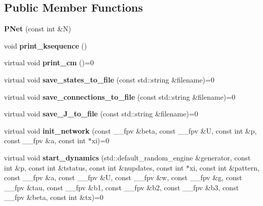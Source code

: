 \subsection*{Public Member Functions}
\begin{DoxyCompactItemize}
\item 
{\bfseries P\+Net} (const int \&N)\hypertarget{classPNet_ae7bb66e9b6e3cc8bebf69f0acc467978}{}\label{classPNet_ae7bb66e9b6e3cc8bebf69f0acc467978}

\item 
void {\bfseries print\+\_\+ksequence} ()\hypertarget{classPNet_af8319c3b3ec476d5008df5fe45c3544d}{}\label{classPNet_af8319c3b3ec476d5008df5fe45c3544d}

\item 
virtual void {\bfseries print\+\_\+cm} ()=0\hypertarget{classPNet_a0f0c008ac7f00564bfdedfd3febd3602}{}\label{classPNet_a0f0c008ac7f00564bfdedfd3febd3602}

\item 
virtual void {\bfseries save\+\_\+states\+\_\+to\+\_\+file} (const std\+::string \&filename)=0\hypertarget{classPNet_a2cac2b992ff0b0520f5dbb1a029676b1}{}\label{classPNet_a2cac2b992ff0b0520f5dbb1a029676b1}

\item 
virtual void {\bfseries save\+\_\+connections\+\_\+to\+\_\+file} (const std\+::string \&filename)=0\hypertarget{classPNet_aad8dbda7540a1ed7d3fa142583770c0d}{}\label{classPNet_aad8dbda7540a1ed7d3fa142583770c0d}

\item 
virtual void {\bfseries save\+\_\+\+J\+\_\+to\+\_\+file} (const std\+::string \&filename)=0\hypertarget{classPNet_a98feeb763aa03d366e6bf5b05c240f25}{}\label{classPNet_a98feeb763aa03d366e6bf5b05c240f25}

\item 
virtual void {\bfseries init\+\_\+network} (const \+\_\+\+\_\+fpv \&beta, const \+\_\+\+\_\+fpv \&U, const int \&p, const \+\_\+\+\_\+fpv \&a, const int $\ast$xi)=0\hypertarget{classPNet_a63efd6e2d7c5a38e0a6ae77af655a405}{}\label{classPNet_a63efd6e2d7c5a38e0a6ae77af655a405}

\item 
virtual void {\bfseries start\+\_\+dynamics} (std\+::default\+\_\+random\+\_\+engine \&generator, const int \&p, const int \&tstatus, const int \&nupdates, const int $\ast$xi, const int \&pattern, const \+\_\+\+\_\+fpv \&a, const \+\_\+\+\_\+fpv \&U, const \+\_\+\+\_\+fpv \&w, const \+\_\+\+\_\+fpv \&g, const \+\_\+\+\_\+fpv \&tau, const \+\_\+\+\_\+fpv \&b1, const \+\_\+\+\_\+fpv \&b2, const \+\_\+\+\_\+fpv \&b3, const \+\_\+\+\_\+fpv \&beta, const int \&tx)=0\hypertarget{classPNet_afb427ff3050f26969782aec6bc76a5a7}{}\label{classPNet_afb427ff3050f26969782aec6bc76a5a7}

\end{DoxyCompactItemize}
